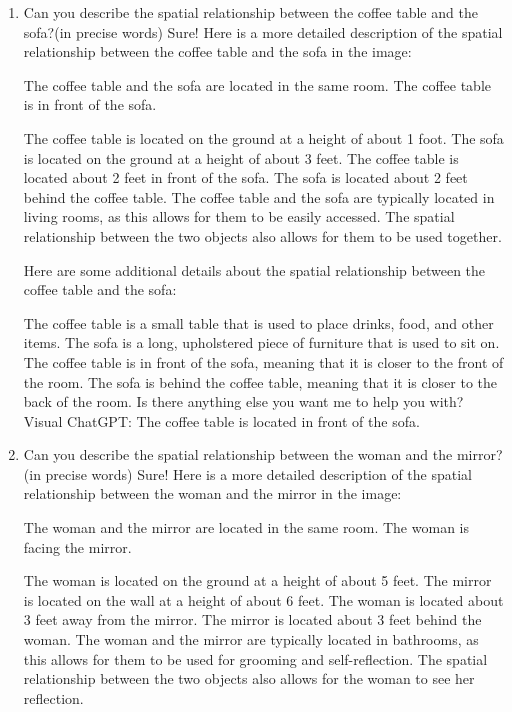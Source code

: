 \begin{enumerate}
    \item Can you describe the spatial relationship between the coffee table and the sofa?(in precise words)
    \subitem 
    Sure! Here is a more detailed description of the spatial relationship between the coffee table and the sofa in the image:
    
    The coffee table and the sofa are located in the same room. The coffee table is in front of the sofa.
    
    The coffee table is located on the ground at a height of about 1 foot.
    The sofa is located on the ground at a height of about 3 feet.
    The coffee table is located about 2 feet in front of the sofa.
    The sofa is located about 2 feet behind the coffee table.
    The coffee table and the sofa are typically located in living rooms, as this allows for them to be easily accessed. The spatial relationship between the two objects also allows for them to be used together.
    
    Here are some additional details about the spatial relationship between the coffee table and the sofa:
    
    The coffee table is a small table that is used to place drinks, food, and other items.
    The sofa is a long, upholstered piece of furniture that is used to sit on.
    The coffee table is in front of the sofa, meaning that it is closer to the front of the room.
    The sofa is behind the coffee table, meaning that it is closer to the back of the room.
    Is there anything else you want me to help you with?
    \subitem Visual ChatGPT: The coffee table is located in front of the sofa.
    \item Can you describe the spatial relationship between the woman and the mirror?(in precise words)
    \subitem 
    Sure! Here is a more detailed description of the spatial relationship between the woman and the mirror in the image:
    
    The woman and the mirror are located in the same room. The woman is facing the mirror.
    
    The woman is located on the ground at a height of about 5 feet.
    The mirror is located on the wall at a height of about 6 feet.
    The woman is located about 3 feet away from the mirror.
    The mirror is located about 3 feet behind the woman.
    The woman and the mirror are typically located in bathrooms, as this allows for them to be used for grooming and self-reflection. The spatial relationship between the two objects also allows for the woman to see her reflection.
    

\end{enumerate}
